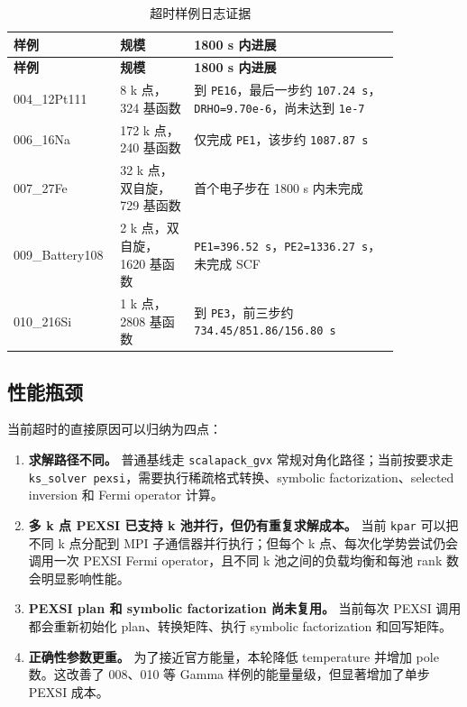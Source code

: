 \documentclass[a4paper,11pt]{article}
\newcommand{\code}[1]{\texttt{#1}}
\begin{document}
\begin{longtable}{@{}p{0.17\linewidth}p{0.18\linewidth}p{0.50\linewidth}@{}}
\caption{超时样例日志证据}
\label{tab:timeout-evidence}\\
\toprule
\textbf{样例} & \textbf{规模} & \textbf{1800 s 内进展}\\
\midrule
\endfirsthead
\toprule
\textbf{样例} & \textbf{规模} & \textbf{1800 s 内进展}\\
\midrule
\endhead
004\_12Pt111 & 8 k 点，324 基函数 & 到 \code{PE16}，最后一步约 \code{107.24 s}，\code{DRHO=9.70e-6}，尚未达到 \code{1e-7}\\
006\_16Na & 172 k 点，240 基函数 & 仅完成 \code{PE1}，该步约 \code{1087.87 s}\\
007\_27Fe & 32 k 点，双自旋，729 基函数 & 首个电子步在 1800 s 内未完成\\
009\_Battery108 & 2 k 点，双自旋，1620 基函数 & \code{PE1=396.52 s}，\code{PE2=1336.27 s}，未完成 SCF\\
010\_216Si & 1 k 点，2808 基函数 & 到 \code{PE3}，前三步约 \code{734.45/851.86/156.80 s}\\
\bottomrule
\end{longtable}

\subsection{性能瓶颈}

当前超时的直接原因可以归纳为四点：

\begin{enumerate}
    \item \textbf{求解路径不同。} 普通基线走 \code{scalapack\_gvx} 常规对角化路径；当前按要求走 \code{ks\_solver pexsi}，需要执行稀疏格式转换、symbolic factorization、selected inversion 和 Fermi operator 计算。
    \item \textbf{多 k 点 PEXSI 已支持 k 池并行，但仍有重复求解成本。} 当前 \code{kpar} 可以把不同 k 点分配到 MPI 子通信器并行执行；但每个 k 点、每次化学势尝试仍会调用一次 PEXSI Fermi operator，且不同 k 池之间的负载均衡和每池 rank 数会明显影响性能。
    \item \textbf{PEXSI plan 和 symbolic factorization 尚未复用。} 当前每次 PEXSI 调用都会重新初始化 plan、转换矩阵、执行 symbolic factorization 和回写矩阵。
    \item \textbf{正确性参数更重。} 为了接近官方能量，本轮降低 temperature 并增加 pole 数。这改善了 008、010 等 Gamma 样例的能量量级，但显著增加了单步 PEXSI 成本。
\end{enumerate}
\end{document}
